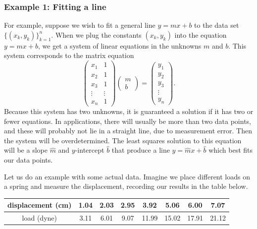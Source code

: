 \subsubsection*{Example 1: Fitting a line}
For example, suppose we wish to fit a general line $y=mx+b$ to the data set $\{(x_k, y_k)\}_{k=1}^n$. 
When we plug the constants $(x_k, y_k)$ into the equation $y=mx+b$, we get a system of linear equations in the unknowns $m$ and $b$. 
This system corresponds to the matrix equation
\[
\begin{pmatrix}
x_1 & 1\\
x_2 & 1\\
x_3 & 1\\
\vdots & \vdots\\
x_n & 1
\end{pmatrix}
\begin{pmatrix}
m\\
b
\end{pmatrix}=
\begin{pmatrix}
y_1\\
y_2\\
y_3\\
\vdots\\
y_n
\end{pmatrix}.
\]
Because this system has two unknowns, it is guaranteed a solution if it has two or fewer equations. 
In applications, there will usually be more than two data points, and these will probably not lie in a straight line, due to measurement error. 
Then the system will be overdetermined. 
The least squares solution to this equation will be a slope $\widehat{m}$ and $y$-intercept $\widehat{b}$ that produce a line $y = \widehat{m}x+\widehat{b}$ which best fits our data points.










Let us do an example with some actual data. Imagine we place different loads on a spring and measure the displacement, recording our results in the table below.
\begin{table}
\begin{tabular}{c|c|c|c|c|c|c|c}
displacement (cm)& 1.04  &2.03  &2.95  &3.92  &5.06  &6.00  &7.07  \\ \hline
load (dyne) & 3.11&  6.01&  9.07&  11.99 &  15.02&  17.91&  21.12\\
\end{tabular}
\end{table}

